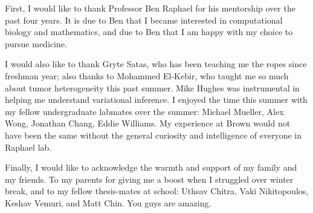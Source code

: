 \documentclass[11pt]{article}
\begin{document}
First, I would like to thank Professor Ben Raphael for his mentorship over the past four years. It is due to Ben that I became interested in computational biology and mathematics, and due to Ben that I am happy with my choice to pursue medicine.

I would also like to thank Gryte Satas, who has been teaching me the ropes since freshman year; also thanks to Mohammed El-Kebir, who taught me so much about tumor heterogeneity this past summer. Mike Hughes was instrumental in helping me understand variational inference. I enjoyed the time this summer with my fellow undergraduate labmates over the summer: Michael Mueller, Alex Wong, Jonathan Chang, Eddie Williams. My experience at Brown would not have been the same without the general curiosity and intelligence of everyone in Raphael lab.

Finally, I would like to acknowledge the warmth and support of my family and my friends. To my parents for giving me a boost when I struggled over winter break, and to my fellow thesis-mates at school: Uthsav Chitra, Vaki Nikitopoulos, Keshav Vemuri, and Matt Chin. You guys are amazing.



\newpage
\end{document}
